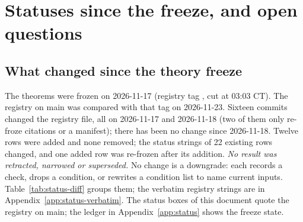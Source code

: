 \section{Statuses since the freeze, and open questions}\label{sec:statuses}\label{sec:scope}\label{sec:who-outside}\label{sec:SL-concl}

\subsection{What changed since the theory freeze}\label{sec:status-diff}

The theorems were frozen on 2026-11-17 (registry tag , cut at 03:03 CT). The registry on
main was compared with that tag on 2026-11-23. Sixteen commits changed the registry file, all on 2026-11-17 and
2026-11-18 (two of them only re-froze citations or a manifest); there has been no change since 2026-11-18. Twelve rows
were added and none removed; the status strings of 22 existing rows changed, and one added row was re-frozen after its
addition. \emph{No result was retracted, narrowed or superseded.} No change is a downgrade: each records a check, drops a
condition, or rewrites a condition list to name current inputs. Table~\ref{tab:status-diff} groups them; the verbatim registry strings are in
Appendix~\ref{app:status-verbatim}. The status boxes of this document quote the registry on main; the ledger in
Appendix~\ref{app:status} shows the freeze state.

